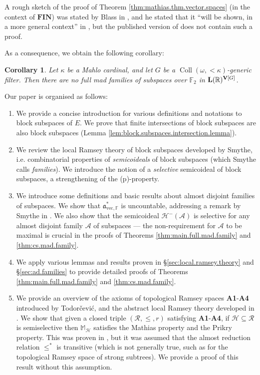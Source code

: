 \documentclass[10pt,a4paper]{amsart}
\theoremstyle{plain}
\numberwithin{equation}{section}
\newtheorem{corollary}[theorem]{Corollary}
\theoremstyle{definition}
\newcommand{\func}{\operatorname}
\newcommand{\R}{\mathbb{R}}
\newcommand{\cal}{\mathcal}
\renewcommand{\frak}{\mathfrak}
\renewcommand{\bf}{\mathbf}
\newcommand{\A}{\cal{A}}
\newcommand{\Coll}{\func{Coll}}
\newcommand{\FIN}{\bf{FIN}}
\newcommand{\V}{\bf{V}}
\renewcommand{\H}{\cal{H}}
\newcommand{\avec}{\frak{a}_{\mathrm{vec},\mathbb{F}}}
\let\strokeL\L
\DeclareRobustCommand{\L}{\ifmmode\mathbf{L}\else\strokeL\fi}
\let\Sec\S
\renewcommand{\S}{\mathcal{S}}
\begin{document}
A rough sketch of the proof of Theorem \ref{thm:mathias.thm.vector.spaces} (in the context of $\FIN$) was stated by Blass in \cite{B87}, and he stated that it ``will be shown, in a more general context'' in \cite{B88}, but the published version of \cite{B88} does not contain such a proof. 

As a consequence, we obtain the following corollary:
\begin{corollary}
\label{cor:no.full.mad.family.in.L(R)}
    Let $\kappa$ be a Mahlo cardinal, and let $G$ be a $\Coll(\omega,<\!\kappa)$-generic filter. Then there are no full mad families of subspaces over $\mathbb{F}_2$ in $\L(\R)^{\V[G]}$.
\end{corollary}

Our paper is organised as follows:
\begin{enumerate}
    \item[(\Sec\ref{sec:setup})] We provide a concise introduction for various definitions and notations to block subspaces of $E$. We prove that finite intersections of block subspaces are also block subspaces (Lemma \ref{lem:block.subspaces.intersection.lemma}).
    
    \item[(\Sec\ref{sec:local.ramsey.theory})] We review the local Ramsey theory of block subspaces developed by Smythe, i.e. combinatorial properties of \emph{semicoideals} of block subspaces (which Smythe calls \emph{families}). We introduce the notion of a \emph{selective} semicoideal of block subspaces, a strengthening of the (p)-property. 
    
    \item[(\Sec\ref{sec:ad.families})] We introduce some definitions and basic results about almost disjoint families of subspaces. We show that $\avec^*$ is uncountable, addressing a remark by Smythe in \cite{S19}. We also show that the semicoideal $\H^-(\A)$ is selective for any almost disjoint family $\A$ of subspaces --- the non-requirement for $\A$ to be maximal is crucial in the proofs of Theorems \ref{thm:main.full.mad.family} and \ref{thm:cs.mad.family}.
    
    \item[(\Sec\ref{sec:full.mad.families})] We apply various lemmas and results proven in \Sec\ref{sec:local.ramsey.theory} and \Sec\ref{sec:ad.families} to provide detailed proofs of Theorems \ref{thm:main.full.mad.family} and \ref{thm:cs.mad.family}.
    
    \item[(\Sec\ref{sec:TRS.and.abstract.mathias.forcing})] We provide an overview of the axioms of topological Ramsey spaces \textbf{A1}-\textbf{A4} introduced by Todor\v{c}evi\'{c}, and the abstract local Ramsey theory developed in \cite{DMN15}. We show that given a closed triple $(\cal{R},\leq,r)$ satisfying \textbf{A1}-\textbf{A4}, if $\H \subseteq \cal{R}$ is semiselective then $\mathbb{M}_\H$ satisfies the Mathias property and the Prikry property. This was proven in \cite{DMN15}, but it was assumed that the almost reduction relation $\leq^*$ is transitive (which is not generally true, such as for the topological Ramsey space of strong subtrees). We provide a proof of this result without this assumption.
    

\end{enumerate}
\end{document}
